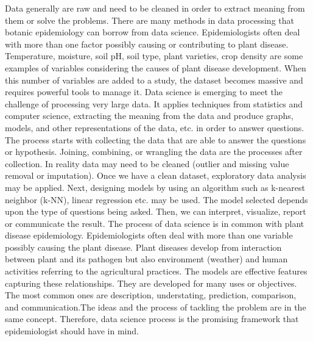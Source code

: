 \documentclass[12pt,a4paper]{article}
\begin{document}


Data generally are raw and need to be cleaned in order to extract meaning from them or solve the problems. There are many methods in data processing that botanic epidemiology can borrow from data science. Epidemiologists often deal with more than one factor possibly causing or contributing to plant disease. Temperature, moisture, soil pH, soil type, plant varieties, crop density are some examples of variables considering the causes of plant disease development. When this number of variables are added to a study, the dataset becomes massive and requires powerful tools to manage it. Data science is emerging to meet the challenge of processing very large data. It applies techniques from statistics and computer science, extracting the meaning from the data and produce graphs, models, and other representations of the data, etc. in order to answer questions. The process starts with collecting the data that are able to answer the questions or hypothesis. Joining, combining, or wrangling the data are the processes after collection. In reality data may need to be cleaned (outlier and missing value removal or imputation). Once we have a clean dataset, exploratory data analysis may be applied. Next, designing models by using an algorithm such as k-nearest neighbor (k-NN), linear regression etc. may be used. The model selected depends upon the type of questions being asked. Then, we can interpret, visualize, report or communicate the result. The process of data science is in common with plant disease epidemiology. Epidemiologists often deal with more than one variable possibly causing the plant disease. Plant diseases develop from interaction between plant and its pathogen but also environment (weather) and human activities referring to the agricultural practices. The models are effective features capturing these relationships. They are developed for many uses or objectives. The most common ones are description, understating, prediction, comparison, and communication.The ideas and the process of tackling the problem are in the same concept. Therefore, data science process is the promising framework that epidemiologist should have in mind.




\end{document}
